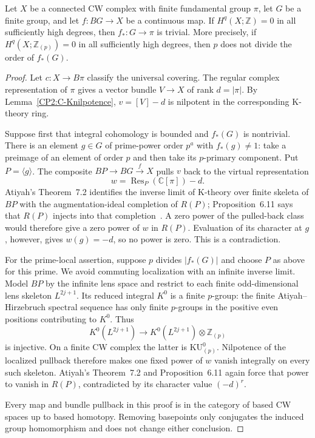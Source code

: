 \begin{theorem}
\label{CP2:C-finite-group-maps}
Let $X$ be a connected CW complex with finite fundamental group
$\pi$, let $G$ be a finite group, and let $f:BG\to X$ be a continuous
map.  If $H^q(X;\mathbb Z)=0$ in all sufficiently high degrees, then
$f_*:G\to\pi$ is trivial.  More precisely, if
$H^q(X;\mathbb Z_{(p)})=0$ in all sufficiently high degrees, then
$p$ does not divide the order of $f_*(G)$.
\end{theorem}
\begin{proof}
Let $c:X\to B\pi$ classify the universal covering.  The regular
complex representation of $\pi$ gives a vector bundle $V\to X$ of
rank $d=|\pi|$.  By Lemma~\ref{CP2:C-Knilpotence},
$v=[V]-d$ is nilpotent in the corresponding K-theory ring.

Suppose first that integral cohomology is bounded and $f_*(G)$ is
nontrivial.  There is an element $g\in G$ of prime-power order
$p^a$ with $f_*(g)\ne1$: take a preimage of an element of order $p$
and then take its $p$-primary component.  Put $P=\langle g\rangle$.
The composite $BP\to BG\xrightarrow{f}X$ pulls $v$ back to the
virtual representation
\[
 w=\operatorname{Res}_{P}(\mathbb C[\pi])-d.
\]
Atiyah's Theorem~7.2 identifies the inverse limit of K-theory over
finite skeleta of $BP$ with the augmentation-ideal completion of
$R(P)$; Proposition~6.11 says that $R(P)$ injects into that
completion~\cite{CP2-Atiyah1961}.  A zero power of the pulled-back
class would therefore give a zero power of $w$ in $R(P)$.  Evaluation
of its character at $g$, however, gives $w(g)=-d$, so no power is
zero.  This is a contradiction.

For the prime-local assertion, suppose $p$ divides $|f_*(G)|$ and
choose $P$ as above for this prime.  We avoid commuting localization
with an infinite inverse limit.  Model $BP$ by the infinite lens
space and restrict to each finite odd-dimensional lens skeleton
$L^{2j+1}$.  Its reduced integral $K^0$ is a finite $p$-group: the
finite Atiyah--Hirzebruch spectral sequence has only finite
$p$-groups in the positive even positions contributing to $K^0$.
Thus
\[
 K^0(L^{2j+1})\longrightarrow
 K^0(L^{2j+1})\otimes\mathbb Z_{(p)}
\]
is injective.  On a finite CW complex the latter is
$\mathrm{KU}_{(p)}^0$.  Nilpotence of the localized pullback therefore
makes one fixed power of $w$ vanish integrally on every such skeleton.
Atiyah's Theorem~7.2 and Proposition~6.11 again force that power to
vanish in $R(P)$, contradicted by its character value $(-d)^r$.

Every map and bundle pullback in this proof is in the category of
based CW spaces up to based homotopy.  Removing basepoints only
conjugates the induced group homomorphism and does not change either
conclusion.
\end{proof}

